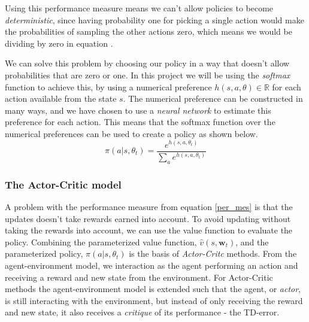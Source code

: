 \documentclass[11pt]{article}
\begin{document}
Using this performance measure means we can't allow policies to become \textit{deterministic},
since having probability one for picking a single action would make the probabilities
of sampling the other actions zero, which means we would be dividing by zero
in equation \label{per_mes}.

We can solve this problem by choosing our policy in a way that doesn't allow probabilities that are zero or one.
In this project we will be using the \textit{softmax} function to achieve this,
by using a numerical preference $h(s, a, \theta) \in \mathbb{R}$
for each action available from the state $s$.
The numerical preference can be constructed in many ways, and we have chosen to use
a \textit{neural network} to estimate this preference for each action.
This means that the softmax function over the numerical preferences can be used to create a policy
as shown below. 
\begin{equation}\label{eq:soft_max}
    \pi(a | s, \theta_t) = \frac{e^{h(s,a,\theta_t)}}{\sum\limits_{a} e^{h(s,a,\theta_t)}}
\end{equation}

\subsubsection{The Actor-Critic model}\label{sec:actor_critic}

A problem with the performance measure from equation \ref{per_mes} is that
the updates doesn't take rewards earned into account. 
To avoid updating without taking the rewards into account, we can
use the value function to evaluate the policy.
Combining the parameterized value function, $\hat{v}(s, \mathbf{w}_t)$,
and the parameterized policy, $\pi(a|s, \theta_t)$ is the basis of \textit{Actor-Critc} methods.
From the agent-environment model, we interaction as the agent performing an action
and receiving a reward and new state from the environment.
For Actor-Critic methods the agent-environment model is extended such that the agent,
or \textit{actor}, is still interacting with the environment, but
instead of only receiving the reward and new state, it also receives
a \textit{critique} of its performance - the TD-error.
\end{document}
